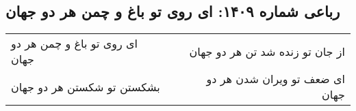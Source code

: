 \begin{center}
\section*{رباعی شماره ۱۴۰۹: ای روی تو باغ و چمن هر دو جهان}
\label{sec:1409}
\begin{longtable}{l p{0.5cm} r}
ای روی تو باغ و چمن هر دو جهان
&&
از جان تو زنده شد تن هر دو جهان
\\
بشکستن تو شکستن هر دو جهان
&&
ای ضعف تو ویران شدن هر دو جهان
\\
\end{longtable}
\end{center}
